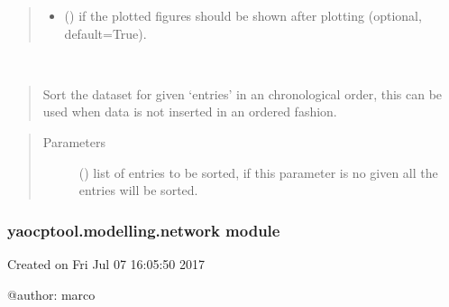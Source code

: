 \documentclass[letterpaper,10pt,english]{sphinxmanual}
\begin{document}
\begin{fulllineitems}
\begin{fulllineitems}
\begin{quote}
\begin{description}
\begin{itemize}
\item {} 
 () \textendash{} if the plotted figures should be shown after plotting (optional, default=True).

\end{itemize}

\end{description}\end{quote}

\end{fulllineitems}


\begin{fulllineitems}
\label{\detokenize{yaocptool.modelling:yaocptool.modelling.dataset.DataSet.sort}}~\begin{quote}

Sort the dataset for given ‘entries’ in an chronological order, this can be used when data is not inserted
in an ordered fashion.
\end{quote}
\begin{quote}\begin{description}
\item[{Parameters}] \leavevmode
{} () \textendash{} list of entries to be sorted, if this parameter is no given all the entries will be sorted.

\end{description}\end{quote}

\end{fulllineitems}


\end{fulllineitems}



\subsubsection{yaocptool.modelling.network module}
\label{\detokenize{yaocptool.modelling:module-yaocptool.modelling.network}}\label{\detokenize{yaocptool.modelling:yaocptool-modelling-network-module}}
Created on Fri Jul 07 16:05:50 2017

@author: marco
\end{document}
